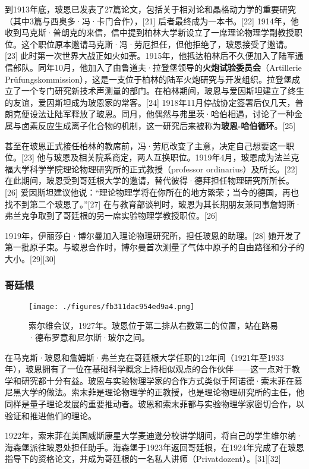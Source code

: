 到1913年底，玻恩已发表了27篇论文，包括关于相对论和晶格动力学的重要研究（其中3篇与西奥多·冯·卡门合作），[21] 后者最终成为一本书。[22] 1914年，他收到马克斯·普朗克的来信，信中提到柏林大学新设立了一席理论物理学副教授职位。这个职位原本邀请马克斯·冯·劳厄担任，但他拒绝了，玻恩接受了邀请。[23] 此时第一次世界大战正如火如荼。1915年，他抵达柏林后不久便加入了陆军通信部队。同年10月，他加入了由鲁道夫·拉登堡领导的\textbf{火炮试验委员会}（Artillerie Prüfungskommission），这是一支位于柏林的陆军火炮研究与开发组织。拉登堡成立了一个专门研究新技术声测量的部门。在柏林期间，玻恩与爱因斯坦建立了终生的友谊，爱因斯坦成为玻恩家的常客。[24] 1918年11月停战协定签署后仅几天，普朗克便设法让陆军释放了玻恩。同月，他偶然与弗里茨·哈伯相遇，讨论了一种金属与卤素反应生成离子化合物的机制，这一研究后来被称为\textbf{玻恩-哈伯循环}。[25]  

甚至在玻恩正式接任柏林的教席前，冯·劳厄改变了主意，决定自己想要这一职位。[23] 他与玻恩及相关院系商定，两人互换职位。1919年4月，玻恩成为法兰克福大学科学学院理论物理研究所的正式教授（professor ordinarius）及所长。[22] 在此期间，玻恩受到哥廷根大学的邀请，替代彼得·德拜担任物理研究所所长。[26] 爱因斯坦建议他说：“理论物理学将在你所在的地方繁荣；当今的德国，再也找不到第二个玻恩了。”[27] 在与教育部谈判时，玻恩为其长期朋友兼同事詹姆斯·弗兰克争取到了哥廷根的另一席实验物理学教授职位。[26]  

1919年，伊丽莎白·博尔曼加入理论物理研究所，担任玻恩的助理。[28] 她开发了第一批原子束。与玻恩合作时，博尔曼首次测量了气体中原子的自由路径和分子的大小。[29][30]
\subsubsection{哥廷根}
\begin{figure}[ht]
\centering
\texttt{[image: ./figures/fb311dac954ed9a4.png]}
\caption{索尔维会议，1927年。玻恩位于第二排从右数第二的位置，站在路易·德布罗意和尼尔斯·玻尔之间。} \label{fig_BE_3}
\end{figure}
在马克斯·玻恩和詹姆斯·弗兰克在哥廷根大学任职的12年间（1921年至1933年），玻恩拥有了一位在基础科学概念上持相似观点的合作伙伴——这一点对于教学和研究都十分有益。玻恩与实验物理学家的合作方式类似于阿诺德·索末菲在慕尼黑大学的做法。索末菲是理论物理学的正教授，也是理论物理研究所的主任，他同样是量子理论发展的重要推动者。玻恩和索末菲都与实验物理学家密切合作，以验证和推进他们的理论。

1922年，索末菲在美国威斯康星大学麦迪逊分校讲学期间，将自己的学生维尔纳·海森堡派往玻恩处担任助手。海森堡于1923年返回哥廷根，在1924年完成了在玻恩指导下的资格论文，并成为哥廷根的一名私人讲师（Privatdozent）。[31][32]

